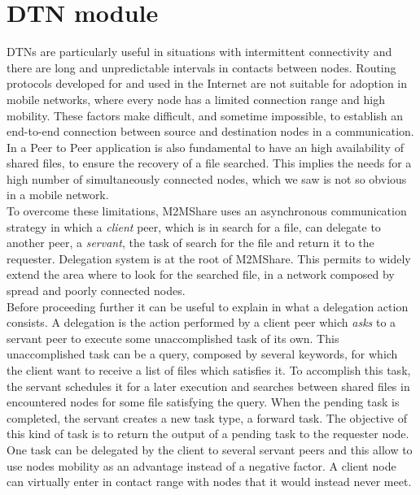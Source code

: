 \section{DTN module}
DTNs are particularly useful in situations with intermittent connectivity and there are long and unpredictable intervals in contacts between nodes. Routing protocols developed for and used in the Internet are not suitable for adoption in mobile networks, where every node has a limited connection range and high mobility. These factors make difficult, and sometime impossible, to establish an end-to-end connection between source and destination nodes in a communication.
\\

In a Peer to Peer application is also fundamental to have an high availability of shared files, to ensure the recovery of a file searched. This implies the needs for a high number of simultaneously connected nodes, which we saw is not so obvious in a mobile network.
\\

To overcome these limitations, M2MShare uses an asynchronous communication strategy in which a \textit{client} peer, which is in search for a file, can delegate to another peer, a \textit{servant}, the task of search for the file and return it to the requester. Delegation system is at the root of M2MShare. This permits to widely extend the area where to look for the searched file, in a network composed by spread and poorly connected nodes.
\\

Before proceeding further it can be useful to explain in what a delegation action consists. A delegation is the action performed by a client peer which \textit{asks} to a servant peer to execute some unaccomplished task of its own. This unaccomplished task can be a query, composed by several keywords, for which the client want to receive a list of files which satisfies it. To accomplish this task, the servant schedules it for a later execution and searches between shared files in encountered nodes for some file satisfying the query. When the pending task is completed, the servant creates a new task type, a forward task. The objective of this kind of task is to return the output of a pending task to the requester node.
\\
One task can be delegated by the client to several servant peers and this allow to use nodes mobility as an advantage instead of a negative factor. A client node can virtually enter in contact range with nodes that it would instead never meet. 
\\

